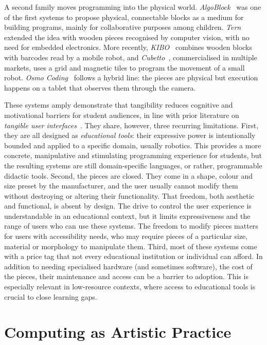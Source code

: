 A second family moves programming into the physical world.
\emph{AlgoBlock}~\cite{suzuki95} was one of the first systems to propose physical, connectable blocks as a medium for building programs, mainly for collaborative purposes among children.
\emph{Tern}~\cite{horn07} extended the idea with wooden pieces recognised by computer vision, with no need for embedded electronics.
More recently, \emph{KIBO}~\cite{sullivan15} combines wooden blocks with barcodes read by a mobile robot, and \emph{Cubetto}~\cite{cubetto}, commercialised in multiple markets, uses a grid and magnetic tiles to program the movement of a small robot.
\emph{Osmo Coding}~\cite{osmo} follows a hybrid line: the pieces are physical but execution happens on a tablet that observes them through the camera.

These systems amply demonstrate that tangibility reduces cognitive and motivational barriers for student audiences, in line with prior literature on \emph{tangible user interfaces}~\cite{ishii97,marshall07}.
They share, however, three recurring limitations.
First, they are all designed as \emph{educational tools}: their expressive power is intentionally bounded and applied to a specific domain, usually robotics.
This provides a more concrete, manipulative and stimulating programming experience for students, but the resulting systems are still domain-specific languages, or rather, programmable didactic tools.
Second, the pieces are closed.
They come in a shape, colour and size preset by the manufacturer, and the user usually cannot modify them without destroying or altering their functionality.
That freedom, both aesthetic and functional, is absent by design.
The drive to control the user experience is understandable in an educational context, but it limits expressiveness and the range of users who can use these systems.
The freedom to modify pieces matters for users with accessibility needs, who may require pieces of a particular size, material or morphology to manipulate them.
Third, most of these systems come with a price tag that not every educational institution or individual can afford.
In addition to needing specialised hardware (and sometimes software), the cost of the pieces, their maintenance and access can be a barrier to adoption.
This is especially relevant in low-resource contexts, where access to educational tools is crucial to close learning gaps.

\section{Computing as Artistic Practice}
\label{sec:related:art}

